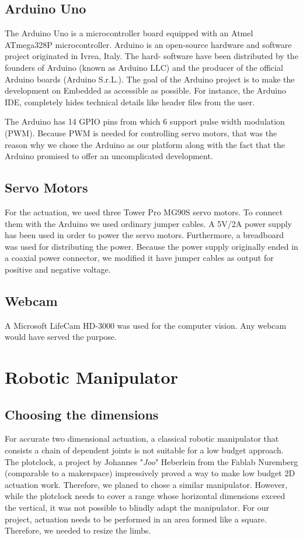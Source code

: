 \documentclass{sig-alternate-05-2015}
\begin{document}
\subsection{Arduino Uno}
The Arduino Uno is a microcontroller board equipped with an Atmel ATmega328P microcontroller. Arduino is an open-source hardware and software project originated in Ivrea, Italy. The hard- software have been distributed by the founders of Arduino (known as Arduino LLC) and the producer of the official Arduino boards (Arduino S.r.L.). The goal of the Arduino project is to make the development on Embedded as accessible as possible. For instance, the Arduino IDE, completely hides technical details like header files from the user.

The Arduino has 14 GPIO pins from which 6 support pulse width modulation (PWM). Because PWM is needed for controlling servo motors, that was the reason why we chose the Arduino as our platform along with the fact that the Arduino promised to offer an uncomplicated development.

\subsection{Servo Motors}
For the actuation, we used three Tower Pro MG90S servo motors. To connect them with the Arduino we used ordinary jumper cables. A 5V/2A power supply has been used in order to power the servo motors. Furthermore, a breadboard was used for distributing the power. Because the power supply originally ended in a coaxial power connector, we modified it have jumper cables as output for positive and negative voltage.

\subsection{Webcam}
A Microsoft LifeCam HD-3000 was used for the computer vision. Any webcam would have served the purpose.

\section{Robotic Manipulator}
\subsection{Choosing the dimensions}
For accurate two dimensional actuation, a classical robotic manipulator that  consists a chain of dependent joints is not suitable for a low budget approach. The plotclock, a project by Johannes "\emph{Joo}" Heberlein from the Fablab Nuremberg (comparable to a makerspace) impressively proved a way to make low budget 2D actuation work. Therefore, we planed to chose a similar manipulator. However, while the plotclock needs to cover a range whose horizontal dimensions exceed the vertical, it was not possible to blindly adapt the manipulator. For our project, actuation needs to be performed in an area formed like a square. Therefore, we needed to resize the limbs.
\end{document}
